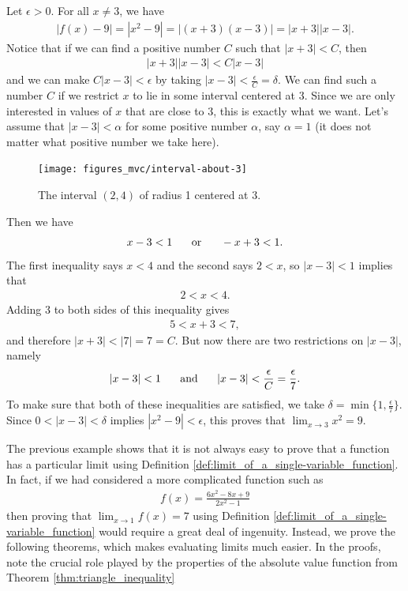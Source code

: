 \documentclass[12pt,letterpaper,reqno]{article}
\numberwithin{equation}{section}
\begin{document}
{\begin{example}
Let $\epsilon>0$. For all $x \neq 3$, we have
\begin{align*}
	|f(x)-9|=|x^2-9|=|(x+3)(x-3)|=|x+3||x-3|.
\end{align*} 
Notice that if we can find a positive number $C$ such that $|x+3|<C$, then
\begin{align*}
	|x+3||x-3|<C|x-3|
\end{align*}
and we can make $C|x-3|<\epsilon$ by taking $|x-3|<\frac{\epsilon}{C}=\delta$. We can find such a number $C$ if we restrict $x$ to lie in some interval centered at 3. Since we are only interested in values of $x$ that are close to 3, this is exactly what we want. Let's assume that $|x-3|<\alpha$ for some positive number $\alpha$, say $\alpha=1$ (it does not matter what positive number we take here). 
\begin{figure}[h]
	\begin{center}
		\texttt{[image: figures\_mvc/interval-about-3]}
	\end{center}
	\caption{The interval $(2,4)$ of radius 1 centered at $3$.}
\end{figure}
Then we have
\begin{align*}
	x-3<1 \hspace{0.5cm} \text{ or }  \hspace{0.5cm} -x+3<1.
\end{align*}
The first inequality says $x<4$ and the second says $2<x$, so $|x-3|<1$ implies that 
\begin{align*}
	2<x<4.
\end{align*}
Adding 3 to both sides of this inequality gives 
\begin{align*}
	5<x+3<7,
\end{align*}
and therefore $|x+3|<|7|=7=C$. But now there are two restrictions on $|x-3|$, namely
\begin{align*}
	|x-3|<1 \hspace{0.5cm} \text{ and } \hspace{0.5cm} |x-3|<\frac{\epsilon}{C}=\frac{\epsilon}{7}.
\end{align*}
To make sure that both of these inequalities are satisfied, we take $\delta=\min\{1,\frac{\epsilon}{7}\}$. Since $0<|x-3|<\delta$ implies $|x^2-9|<\epsilon$, this proves that $\lim_{x \to 3}x^2=9$.
\end{example}
The previous example shows that it is not always easy to prove that a function has a particular limit using Definition \ref{def:limit_of_a_single-variable_function}. In fact, if we had considered a more complicated function such as 
\begin{align*}
	f(x)=\frac{6x^2-8x+9}{2x^2-1}
\end{align*}
then proving that $\lim_{x \to 1}f(x)=7$ using Definition \ref{def:limit_of_a_single-variable_function} would require a great deal of ingenuity. Instead, we prove the following theorems, which makes evaluating limits much easier. In the proofs, note the crucial role played by the properties of the absolute value function from Theorem \ref{thm:triangle_inequality}

}
\end{document}
